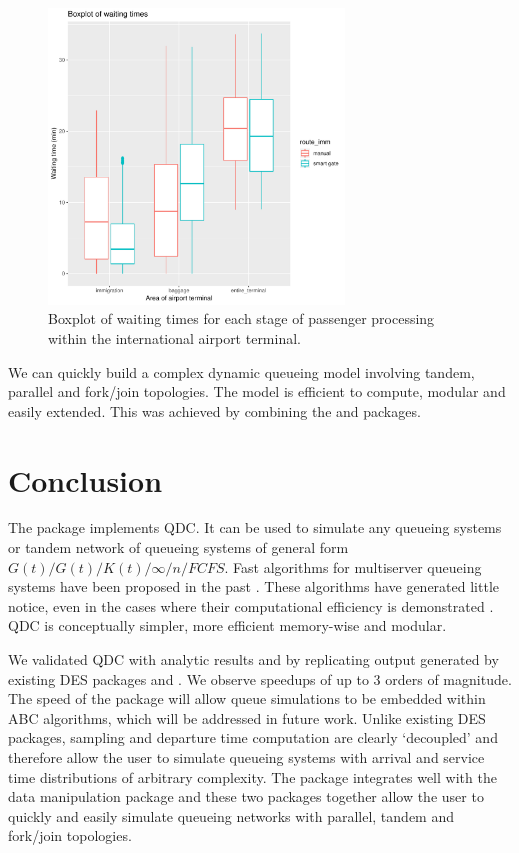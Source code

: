 \documentclass[article]{jss}
\begin{document}
\begin{figure}[!htb]
\centering
\includegraphics[width = 0.7\textwidth]{Figures/boxplot_dplyr.pdf}
\caption{Boxplot of waiting times for each stage of passenger processing within the international airport terminal. }
\label{fig:boxplot_dplyr.pdf}
\end{figure}

We can quickly build a complex dynamic queueing model involving tandem, parallel and fork/join topologies. The model is efficient to compute, modular and easily extended. This was achieved by combining the  and  packages. 

\section{Conclusion}

The  package  implements QDC. It can be used to simulate any queueing systems or tandem network of queueing systems of general form $G(t)/G(t)/K(t)/\infty/n/FCFS$. Fast algorithms for multiserver queueing systems have been proposed in the past \citep{krivulin_recursive_1994,sutton_inference_2010,kin_generalized_2010}. These algorithms have generated little notice, even in the cases where their computational efficiency is demonstrated \citep{kin_generalized_2010}. QDC is conceptually simpler, more efficient memory-wise and modular. 

We validated QDC with analytic results and by replicating output generated by existing DES packages  and . We observe speedups of up to 3 orders of magnitude. The speed of the package will allow queue simulations to be embedded within ABC algorithms, which will be addressed in future work. Unlike existing DES packages, sampling and departure time computation are clearly `decoupled' and therefore allow the user to simulate queueing systems with arrival and service time distributions of arbitrary complexity. The package integrates well with the data manipulation package  and these two packages together allow the user to quickly and easily simulate queueing networks with parallel, tandem and fork/join topologies. 
\end{document}

